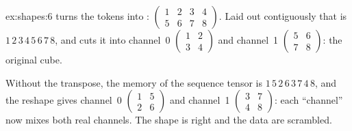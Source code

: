 \begin{solution}{ex:shapes:6}
 turns the  tokens into :
$\begin{pmatrix}1&2&3&4\\5&6&7&8\end{pmatrix}$. Laid out contiguously that is
$1\,2\,3\,4\,5\,6\,7\,8$, and  cuts it into channel~0
$\begin{pmatrix}1&2\\3&4\end{pmatrix}$ and channel~1 $\begin{pmatrix}5&6\\7&8\end{pmatrix}$: the
original cube.

Without the transpose, the memory of the sequence tensor is $1\,5\,2\,6\,3\,7\,4\,8$, and the reshape
gives channel~0 $\begin{pmatrix}1&5\\2&6\end{pmatrix}$ and channel~1
$\begin{pmatrix}3&7\\4&8\end{pmatrix}$: each ``channel'' now mixes both real channels. The shape is
right and the data are scrambled.
\end{solution}
